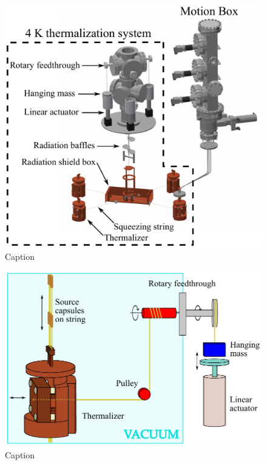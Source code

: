\begin{figure}[htbp]
    \centering
    \includegraphics[width=0.8\linewidth]{Figures/thermalization_system_labeled.pdf}
    \caption{Caption}
    \label{fig:DCS_4K_thermalizer}
\end{figure}

\begin{figure}[htbp]
    \centering
    \includegraphics[width=0.8\linewidth]{Figures/Thermalizer_schematic_labeled.pdf}
    \caption{Caption}
    \label{fig:DCS_4K_schematic}
\end{figure}

